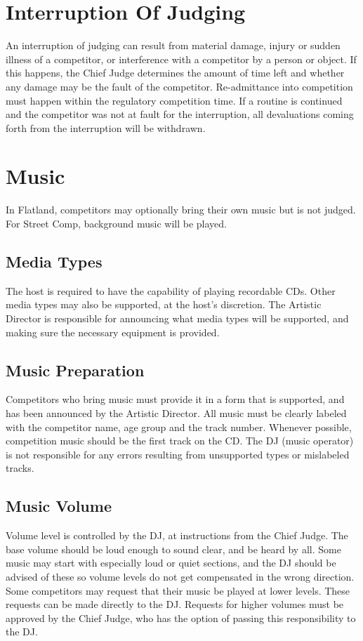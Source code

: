 \section{Interruption Of Judging}
An interruption of judging can result from material damage, injury or sudden illness of a competitor, or interference with a competitor by a person or object.
If this happens, the Chief Judge determines the amount of time left and whether any damage may be the fault of the competitor.
Re-admittance into competition must happen within the regulatory competition time.
If a routine is continued and the competitor was not at fault for the interruption, all devaluations coming forth from the interruption will be withdrawn.

\section{Music}
In Flatland, competitors may optionally bring their own music but is not judged.
For Street Comp, background music will be played.

\subsection{Media Types}
The host is required to have the capability of playing recordable CDs.
Other media types may also be supported, at the host's discretion.
The Artistic Director is responsible for announcing what media types will be supported, and making sure the necessary equipment is provided.

\subsection{Music Preparation}
Competitors who bring music must provide it in a form that is supported, and has been announced by the Artistic Director.
All music must be clearly labeled with the competitor name, age group and the track number.
Whenever possible, competition music should be the first track on the CD.
The DJ (music operator) is not responsible for any errors resulting from unsupported types or mislabeled tracks.

\subsection{Music Volume}
Volume level is controlled by the DJ, at instructions from the Chief Judge.
The base volume should be loud enough to sound clear, and be heard by all.
Some music may start with especially loud or quiet sections, and the DJ should be advised of these so volume levels do not get compensated in the wrong direction.
Some competitors may request that their music be played at lower levels.
These requests can be made directly to the DJ.
Requests for higher volumes must be approved by the Chief Judge, who has the option of passing this responsibility to the DJ.

